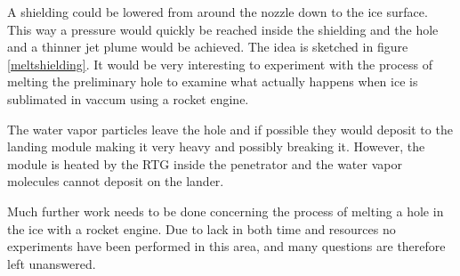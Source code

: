 A shielding could be lowered from around the nozzle down to the ice surface. This way a pressure would quickly be reached inside the shielding and the hole and a thinner jet plume would be achieved. The idea is sketched in figure \ref{meltshielding}.
It would be very interesting to experiment with the process of melting the preliminary hole to examine what actually happens when ice is sublimated in vaccum using a rocket engine. 


The water vapor particles leave the hole and if possible they would deposit to the landing module making it very heavy and possibly breaking it. However, the module is heated by the RTG inside the penetrator and the water vapor molecules cannot deposit on the lander.


Much further work needs to be done concerning the process of melting a hole in the ice with a rocket engine. Due to lack in both time and resources no experiments have been performed in this area, and many questions are therefore left unanswered. 
